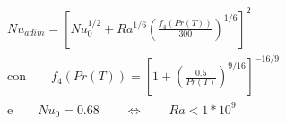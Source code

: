 \documentclass[a4paper,10pt]{article}                                                                                       %
\begin{document}
\begin{equation}                                                                                                            %
  \begin{aligned}                                                                                                           %
  \label{eqn:nu_ra}                                                                                                         %
  Nu_{adim} = \left[Nu_0^{1/2}+Ra^{1/6}\left(\frac{f_4(Pr(T))}{300}\right)^{1/6}\right]^{2}                                 %
  \\\text{con}\qquad                                                                                                        %
  f_4(Pr(T)) = \left[1+\left(\frac{0.5}{Pr(T)}\right)^{9/16}\right]^{-16/9}                                                 %
  \\\text{e}\qquad                                                                                                          %
  Nu_0 = 0.68                                                                                                               %
  \qquad\Leftrightarrow\qquad                                                                                               %
  Ra<1*10^9\qquad                                                                                                           %
  \end{aligned}                                                                                                             %
\end{equation}                                                                                                              %
\end{document}
